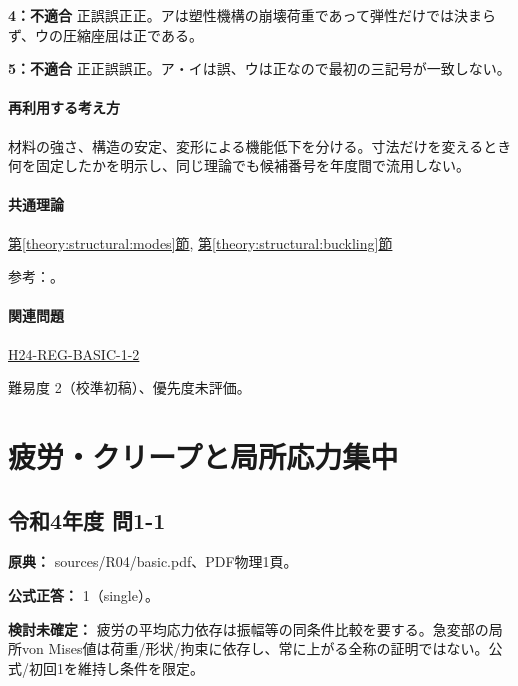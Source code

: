 \noindent\textbf{4：不適合} 正誤誤正正。アは塑性機構の崩壊荷重であって弾性だけでは決まらず、ウの圧縮座屈は正である。\par

\noindent\textbf{5：不適合} 正正誤誤正。ア・イは誤、ウは正なので最初の三記号が一致しない。\par

\paragraph{再利用する考え方} 材料の強さ、構造の安定、変形による機能低下を分ける。寸法だけを変えるとき何を固定したかを明示し、同じ理論でも候補番号を年度間で流用しない。

\paragraph{共通理論} \hyperref[theory:structural:modes]{第\ref*{theory:structural:modes}節}, \hyperref[theory:structural:buckling]{第\ref*{theory:structural:buckling}節}

\par 参考：\cite{struct_mit_beam,struct_mit_buckling,struct_mlit_limit}。

\paragraph{関連問題} \hyperref[q:h24-reg-basic-1-2]{H24-REG-BASIC-1-2}

\par 難易度 2（校準初稿）、優先度未評価。

\section{疲労・クリープと局所応力集中}

\subsection{令和4年度 問1-1}
\label{q:r04-reg-basic-1-1}

\noindent\textbf{原典：} sources/R04/basic.pdf、PDF物理1頁。

\textbf{公式正答：} 1（single）。

\par\textbf{検討未確定：} 疲労の平均応力依存は振幅等の同条件比較を要する。急変部の局所von Mises値は荷重/形状/拘束に依存し、常に上がる全称の証明ではない。公式/初回1を維持し条件を限定。

